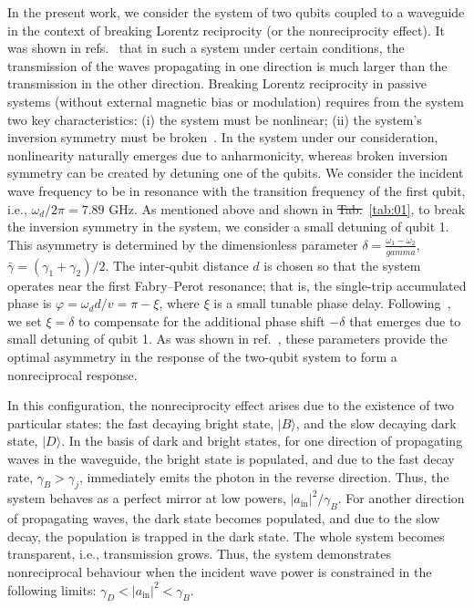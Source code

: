 \documentclass[lettersize,journal]{IEEEtran}
\providecommand{\DIFaddtex}[1]{{\protect\color{blue}\uwave{#1}}} %
\providecommand{\DIFdeltex}[1]{{\protect\color{red}\sout{#1}}}                      %
\providecommand{\DIFaddbegin}{} %
\providecommand{\DIFaddend}{} %
\providecommand{\DIFdelbegin}{} %
\providecommand{\DIFdelend}{} %
\providecommand{\DIFadd}[1]{\texorpdfstring{\DIFaddtex{#1}}{#1}} %
\providecommand{\DIFdel}[1]{\texorpdfstring{\DIFdeltex{#1}}{}} %
\newcommand{\DIFscaledelfig}{0.5}
\newlength{\DIFdelgraphicswidth} %
\newlength{\DIFdelgraphicsheight} %
\newcommand{\DIFaddincludegraphics}[2][]{{\color{blue}\fbox{\DIFOincludegraphics[#1]{#2}}}} %
\newcommand{\DIFdelincludegraphics}[2][]{%
\sbox{\DIFdelgraphicsbox}{\DIFOincludegraphics[#1]{#2}}%
\settoboxwidth{\DIFdelgraphicswidth}{\DIFdelgraphicsbox} %
\settoboxtotalheight{\DIFdelgraphicsheight}{\DIFdelgraphicsbox} %
\scalebox{\DIFscaledelfig}{%
\parbox[b]{\DIFdelgraphicswidth}{\usebox{\DIFdelgraphicsbox}\\[-\baselineskip] \rule{\DIFdelgraphicswidth}{0em}}\llap{\resizebox{\DIFdelgraphicswidth}{\DIFdelgraphicsheight}{%
\setlength{\unitlength}{\DIFdelgraphicswidth}%
\begin{picture}(1,1)%
\thicklines\linethickness{2pt} %
{\color[rgb]{1,0,0}\put(0,0){\framebox(1,1){}}}%
{\color[rgb]{1,0,0}\put(0,0){\line( 1,1){1}}}%
{\color[rgb]{1,0,0}\put(0,1){\line(1,-1){1}}}%
\end{picture}%
}\hspace*{3pt}}} %
} %
\DeclareRobustCommand{\DIFaddbegin}{\DIFOaddbegin \let\includegraphics\DIFaddincludegraphics} %
\DeclareRobustCommand{\DIFaddend}{\DIFOaddend \let\includegraphics\DIFOincludegraphics} %
\DeclareRobustCommand{\DIFdelbegin}{\DIFOdelbegin \let\includegraphics\DIFdelincludegraphics} %
\DeclareRobustCommand{\DIFdelend}{\DIFOaddend \let\includegraphics\DIFOincludegraphics} %
\begin{document}
In the present work, we consider the system of two qubits coupled to a waveguide in the context of breaking Lorentz reciprocity (or the nonreciprocity effect).
It was shown in refs.~\cite{dai_rectification_2015,muller_nonreciprocal_2017,rosario_hamann_nonreciprocity_2018, Nefedkin2022} that in such a system under certain conditions, the transmission of the waves propagating in one direction is much larger than the transmission in the other direction.
Breaking Lorentz reciprocity in passive systems (without external magnetic bias or modulation) requires from the system two key characteristics: (i) the system must be nonlinear; (ii) the system's inversion symmetry must be broken~\cite{cotrufo2021nonlinearity1}.
In the system under our consideration, nonlinearity naturally emerges due to anharmonicity, whereas broken inversion symmetry can be created by detuning one of the qubits.
We consider the incident wave frequency to be in resonance with the transition frequency of the first qubit, i.e., $\omega_d / 2\pi = 7.89$ GHz.
As mentioned above and shown in \DIFdelbegin \DIFdel{Tab.}\DIFdelend \DIFaddbegin \DIFadd{Table}\DIFaddend ~\ref{tab:01}, to break the inversion symmetry in the system, we consider a small detuning of qubit 1.
This asymmetry is determined by the dimensionless parameter \DIFdelbegin \DIFdel{$\delta = \frac{\omega_1 - \omega_2}{\bar{gamma}}$}\DIFdelend \DIFaddbegin \DIFadd{$\delta = \frac{\omega_1 - \omega_2}{\bar{\gamma}}$}\DIFaddend , $\bar{\gamma} = (\gamma_1 + \gamma_2) / 2$.
The inter-qubit distance $d$ is chosen so that the system operates near the first Fabry–Perot resonance; that is, the single-trip accumulated phase is $\varphi = \omega_d d / v = \pi - \xi$, where $\xi$ is a small tunable phase delay. 
Following~\cite{dai_rectification_2015,muller_nonreciprocal_2017}, we set $\xi = \delta$ to compensate for the additional phase shift $-\delta$ that emerges due to small detuning of qubit 1. 
As was shown in ref.~\cite{muller_nonreciprocal_2017}, these parameters provide the optimal asymmetry in the response of the two-qubit system to form a nonreciprocal response.

In this configuration, the nonreciprocity effect arises due to the existence of two particular states: the fast decaying bright state, $|B\rangle$, and the slow decaying dark state, $|D\rangle$.
In the basis of dark and bright states, for one direction of propagating waves in the waveguide, the bright state is populated, and due to the fast decay rate, $\gamma_B > \gamma_j$, immediately emits the photon in the reverse direction. 
Thus, the system behaves as a perfect mirror at low powers, $|a_\mathrm{in}|^2 / \gamma_B$.
For another direction of propagating waves, the dark state becomes populated, and due to the slow decay, the population is trapped in the dark state. 
The whole system becomes transparent, i.e., transmission grows.
Thus, the system demonstrates nonreciprocal behaviour when the incident wave power is constrained in the following limits: $ \gamma_D < |a_\mathrm{in}|^2 < \gamma_B$.
\end{document}
